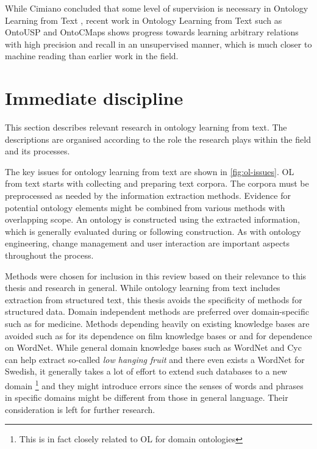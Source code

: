 \documentclass[a4paper]{report}
\begin{document}
While Cimiano concluded that some level of supervision is necessary in Ontology Learning from Text \citep{Cimiano06}, recent work in Ontology Learning from Text such as OntoUSP\citep{Poon2010OntoUSP} and OntoCMaps \citep{Zouaq11OntoCmaps} shows progress towards learning arbitrary relations with high precision and recall in an unsupervised manner, which is much closer to machine reading than earlier work in the field.


\section{Immediate discipline}
\label{sec:lit-rev:immediate}

This section describes relevant research in ontology learning from text.
The descriptions are organised according to the role the research plays within the field and its processes.

The key issues for ontology learning from text are shown in \ref{fig:ol-issues}.
OL from text starts with collecting and preparing text corpora.
The corpora must be preprocessed as needed by the information extraction methods.
Evidence for potential ontology elements might be combined from various methods with overlapping scope.
An ontology is constructed using the extracted information, which is generally evaluated during or following construction.
As with ontology engineering, change management and user interaction are important aspects throughout the process.

Methods were chosen for inclusion in this review based on their relevance to this thesis and research in general.
While ontology learning from text includes extraction from structured text, this thesis avoids the specificity of methods for structured data.
Domain independent methods are preferred over domain-specific such as \cite{LeeEtAl03OLMed} for medicine.
Methods depending heavily on existing knowledge bases are avoided such as \cite{Gulla08LOUIE} for its dependence on film knowledge bases or \cite{Drumond10PREHE} and \cite{HaiTaoEtAl08Clonto} for dependence on WordNet\cite{Fellbaum98WordNet}.
While general domain knowledge bases such as WordNet and Cyc\cite{Lenat95Cyc} can help extract so-called \emph{low hanging fruit} and there even exists a WordNet for Swedish\cite{Viberg02SWordNet}, it generally takes a lot of effort to extend such databases to a new domain \footnote{This is in fact closely related to OL for domain ontologies} and they might introduce errors since the senses of words and phrases in specific domains might be different from those in general language.
Their consideration is left for further research.
\end{document}
